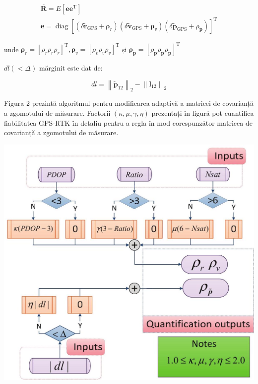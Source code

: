 \documentclass[10pt]{report}
\begin{document}
\begin{equation}
  \begin{gathered}
    \overline{\boldsymbol{R}}=E\left[\boldsymbol{e} \boldsymbol{e}^{\mathrm{T}}\right] \\
    \boldsymbol{e}=\operatorname{diag}\left[\left(\delta \widetilde{\boldsymbol{r}}_{\mathrm{GPS}}+\boldsymbol{\rho}_{r}\right)\left(\delta \widetilde{\boldsymbol{v}}_{\mathrm{GPS}}+\boldsymbol{\rho}_{v}\right)\left(\delta \widetilde{\boldsymbol{p}}_{\mathrm{GPS}}+\rho_{\widetilde{\boldsymbol{p}}}\right)\right]^{\mathrm{T}}
  \end{gathered}
\end{equation}


unde $\boldsymbol{\rho}_{r}=\left[\rho_{r} \rho_{r} \rho_{r}\right]^{\mathrm{T}}, \boldsymbol{\rho}_ {v}=\left[\rho_{v} \rho_{v} \rho_{v}\right]^{\mathrm{T}}$ și $\boldsymbol{\rho}_{\widetilde{\boldsymbol{ p}}}=\left[\rho_{\widetilde{\boldsymbol{p}}} \rho_{\widetilde{\boldsymbol{p}}} \rho_{\widetilde{\boldsymbol{p}}}\right] ^{\mathrm{T}}$

$d l(<\Delta)$ mărginit este dat de:

\begin{equation}
  d l=\left\|\widetilde{\boldsymbol{p}}_{12}\right\|_{2}-\left\|\boldsymbol{l}_{12}\right\|_{2}
\end{equation}


Figura 2 prezintă algoritmul pentru modificarea adaptivă a matricei de covarianță a zgomotului de măsurare. Factorii $(\kappa, \mu, \gamma, \eta)$ prezentați în figură pot cuantifica fiabilitatea GPS-RTK în detaliu pentru a regla în mod corespunzător matricea de covarianță a zgomotului de măsurare.

\begin{center}
  \includegraphics[max width=\textwidth]{2023_06_04_c79b87a911fb798e1754g-7}
\end{center}
\end{document}
